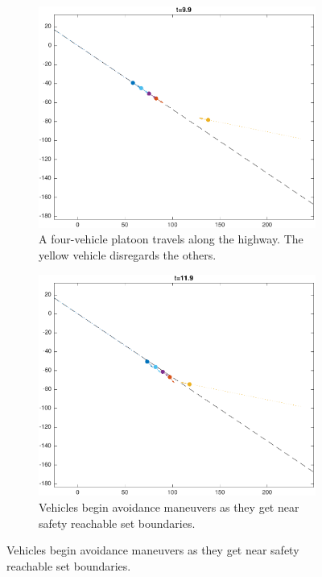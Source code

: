 \begin{figure}
    \centering
    \begin{subfigure}[t]{0.45\columnwidth} \label{subfig:in_100}
        \includegraphics[width=\columnwidth]{fig/in_100}
        \caption{A four-vehicle platoon travels along the highway. The yellow vehicle disregards the others.}
    \end{subfigure}
    \begin{subfigure}[t]{0.45\columnwidth} \label{subfig:in_120}
        \includegraphics[width=\columnwidth]{fig/in_120}
        \caption{Vehicles begin avoidance maneuvers as they get near safety reachable set boundaries.}
    \end{subfigure}


\end{figure}
